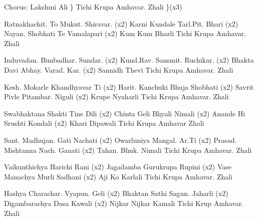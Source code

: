 \documentclass{article}
\begin{document}
Chorus:
Lakshmi Ali \}
Tichi Krupa Amhavar. Zhali \}(x3)

Ratnakhachit. To Mukut. Shiravar. (x2)
Karni Kundale Tarl.Pit. Bhari (x2)
Nayan. Shobhati Te Vamalapari (x2)
Kum Kum Bharli Tichi Krupa Amhavar. Zhali

Induvadan. Bimbadhar. Sundar. (x2)
Kund.Rav. Sansmit. Ruchikar. (x2)
Bhakta Davi Abhay. Varad. Kar. (x2)
Sannidh Thevi Tichi Krupa Amhavar. Zhali

Kesh. Mokarle Khandhyavar Ti (x2)
Harit. Kanchuki Bhuja Shobhati (x2)
Savrit Pivle Pitambar. Niguli (x2)
Krupe Nyaharli Tichi Krupa Amhavar. Zhali

Swabhaktana Shakti Tine Dili (x2)
Chinta Geli Bhyali Nimali (x2)
Anande Hi Srushti Kondali (x2)
Khari Dipawali Tichi Krupa Amhavar Zhali

Sant. Madhujan. Gati Nachati (x2)
Owarluniya Mangal. Ar.Ti (x2)
Prasad. Mishtanna Nach. Ganati (x2)
Tahan. Bhuk. Nimali Tichi Krupa Amhavar. Zhali

Vaikunthichya Harichi Rani (x2)
Jagadamba Gurukrupa Rupini (x2)
Vase Manachya Murli Sadhani (x2)
Aji Ko Karlali Tichi Krupa Amhavar. Zhali

Hashya Charachar. Vyapun. Geli (x2)
Bhaktan Sathi Sagun. Jaharli (x2)
Digambarachya Dasa Kawali (x2)
Nijkar Nijkar Kamali Tichi Krup Amhavar. Zhali
\end{document}

